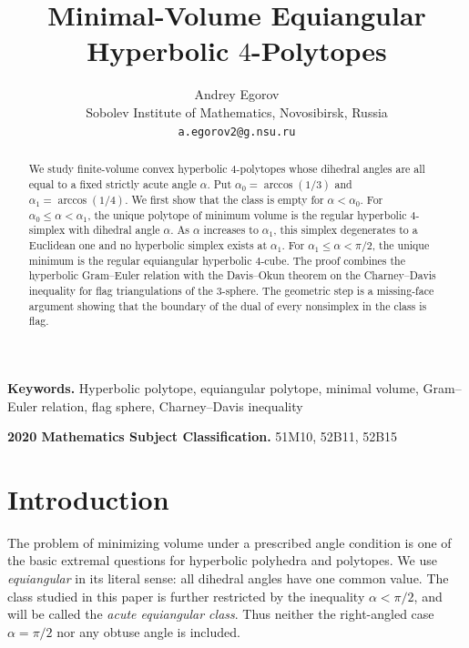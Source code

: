 \documentclass[12pt,a4paper]{article}
\theoremstyle{thmstyleone}
\theoremstyle{thmstylethree}
\theoremstyle{thmstyletwo}
\begin{document}
	

\title{Minimal-Volume Equiangular Hyperbolic $4$-Polytopes}

\author{Andrey Egorov\\
	Sobolev Institute of Mathematics, Novosibirsk, Russia\\
	\texttt{a.egorov2@g.nsu.ru}}
\date{}
\maketitle


\begin{abstract}
We study finite-volume convex hyperbolic $4$-polytopes whose
dihedral angles are all equal to a fixed strictly acute angle $\alpha$.
Put
$\alpha_0=\arccos(1/3)$ and $\alpha_1=\arccos(1/4)$.  We first show that the
class is empty for $\alpha<\alpha_0$.  For
$\alpha_0\leq\alpha<\alpha_1$, the unique polytope of minimum volume is the
regular hyperbolic $4$-simplex with dihedral angle $\alpha$.  As
$\alpha$ increases to $\alpha_1$, this simplex degenerates to a Euclidean
one and no hyperbolic simplex exists at $\alpha_1$.  For
$\alpha_1\leq\alpha<\pi/2$, the unique minimum is the regular equiangular
hyperbolic $4$-cube.  The proof combines the hyperbolic Gram--Euler relation
with the Davis--Okun theorem on the Charney--Davis inequality for flag
triangulations of the $3$-sphere.  The geometric step is a missing-face
argument showing that the boundary of the dual of every nonsimplex in the
class is flag.
\end{abstract}

\noindent\textbf{Keywords.} Hyperbolic polytope, equiangular polytope, minimal volume, Gram--Euler relation, flag sphere, Charney--Davis inequality

\medskip
\noindent\textbf{2020 Mathematics Subject Classification.} 51M10, 52B11, 52B15

\maketitle

\section{Introduction}

The problem of minimizing volume under a prescribed angle condition is one
of the basic extremal questions for hyperbolic polyhedra and polytopes.  We
use \emph{equiangular} in its literal sense: all dihedral angles have one
common value.  The class studied in this paper is further restricted by the
inequality $\alpha<\pi/2$, and will be called the \emph{acute
equiangular class}.  Thus neither the right-angled case $\alpha=\pi/2$ nor
any obtuse angle is included. 
\end{document}
